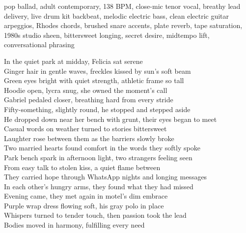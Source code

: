 
\begin{notes}
\end{notes}

\begin{style}
pop ballad, adult contemporary, 138 BPM, close-mic tenor vocal, breathy lead delivery, live drum kit backbeat, melodic electric bass, clean electric guitar arpeggios, Rhodes chords, brushed snare accents, plate reverb, tape saturation, 1980s studio sheen, bittersweet longing, secret desire, midtempo lift, conversational phrasing
\end{style}

\begin{lyrics}

In the quiet park at midday, Felicia sat serene\\
Ginger hair in gentle waves, freckles kissed by sun’s soft beam\\
Green eyes bright with quiet strength, athletic frame so tall\\
Hoodie open, lycra snug, she owned the moment’s call\\

Gabriel pedaled closer, breathing hard from every stride\\
Fifty-something, slightly round, he stopped and stepped aside\\
He dropped down near her bench with grunt, their eyes began to meet\\
Casual words on weather turned to stories bittersweet\\

Laughter rose between them as the barriers slowly broke\\
Two married hearts found comfort in the words they softly spoke\\

Park bench spark in afternoon light, two strangers feeling seen\\
From easy talk to stolen kiss, a quiet flame between\\
They carried hope through WhatsApp nights and longing messages\\
In each other’s hungry arms, they found what they had missed\\

Evening came, they met again in motel’s dim embrace\\
Purple wrap dress flowing soft, his gray polo in place\\
Whispers turned to tender touch, then passion took the lead\\
Bodies moved in harmony, fulfilling every need\\


\end{lyrics}
